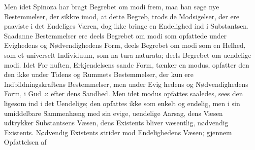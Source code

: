 \documentclass[12pt,a4paper]{book}
\begin{document}
Men idet Spinoza har bragt Begrebet om modi frem, maa
han søge nye Bestemmelser, der sikkre imod, at dette Begreb,
trods de Modsigelser, der ere paaviste i det Endeliges Væren,
%
%
dog ikke bringe en Endelighed ind i Substantsen. Saadanne
Bestemmelser ere deels Begrebet om modi som opfattede under
Evighedens og Nødvendighedens Form, deels Begrebet om
modi som en Helhed, som et universelt Individuum, som na\-%
tura naturata; deels Begrebet om uendelige modi. Idet For\-%
nuften, Erkjendelsens sande Form, tænker en modus, opfatter
den den ikke under Tidens og Rummets Bestemmelser, der
kun ere Indbildningskraftens Bestemmelser, men under Evig\-%
hedens og Nødvendighedens Form, i Gud ɔ: efter dens Sandhed.
Men idet modus opfattes saaledes, sees den ligesom ind i det
Uendelige; den opfattes ikke som enkelt og endelig, men i sin
umiddelbare Sammenhæng med sin evige, uendelige Aarsag,
dens Væsen udtrykker Substantsens Væsen, dens Existents
bliver væsentlig, nødvendig Existents. Nødvendig Existents
strider mod Endelighedens Væsen; gjennem Opfattelsen af
\end{document}
